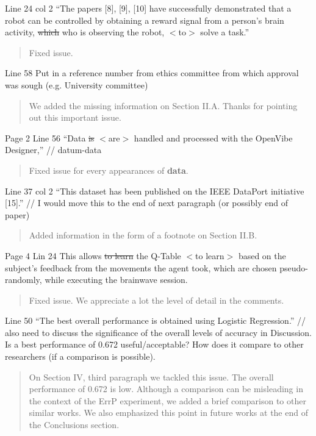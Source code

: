 \documentclass[journal,onecolumn,12pt]{IEEEtran}
\begin{document}
Line 24 col 2 “The papers [8], [9], [10] have successfully demonstrated that a robot can be controlled by obtaining a reward signal from a person’s brain activity, \sout{which} who is observing the robot, $<$to$>$ solve a task.”

\begin{quotation}
{\color{blue}
Fixed issue.
}
\end{quotation}

Line 58 Put in a reference number from ethics committee from which approval was sough (e.g. University committee)

\begin{quotation}
{\color{blue}
We added the missing information on Section II.A.  Thanks for pointing out this important issue.
}
\end{quotation}

Page 2
Line 56 “Data \sout{is} $<$are$>$ handled and processed with the OpenVibe Designer,” // datum-data

\begin{quotation}
{\color{blue}
Fixed issue for every appearances of \textbf{data}.
}
\end{quotation}

Line 37 col 2 “This dataset has been published on the IEEE DataPort initiative [15].” // I would move this to the end of next paragraph (or possibly end of paper)

\begin{quotation}
{\color{blue}
Added information in the form of a footnote on Section II.B.
}
\end{quotation}

Page 4
Lin 24 This allows \sout{to learn} the Q-Table $<$to learn$>$ based on the subject’s feedback from the movements the agent
took, which are chosen pseudo-randomly, while executing the brainwave session.

\begin{quotation}
{\color{blue}
Fixed issue.  We appreciate a lot the level of detail in the comments.
}
\end{quotation}

Line 50 “The best overall performance is obtained using Logistic Regression.” // also need to discuss the significance of the overall levels of accuracy in Discussion. Is a best performance of 0.672 useful/acceptable? How does it compare to other researchers (if a comparison is possible).

\begin{quotation}
{\color{blue}
On Section IV, third paragraph we tackled this issue.  The overall performance of 0.672 is low.  Although a comparison can be misleading in the context of the ErrP experiment, we added a brief comparison to other similar works.  We also emphasized this point in future  works at the end of the Conclusions section.
}
\end{quotation}
\end{document}
